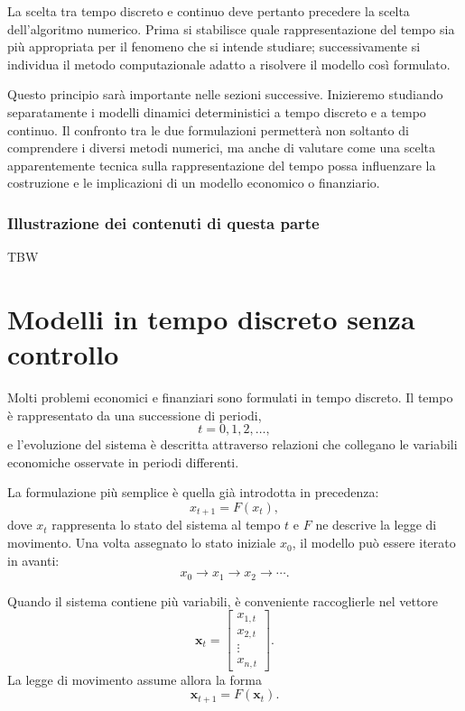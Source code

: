 \documentclass{book}
\begin{document}
La scelta tra tempo discreto e continuo deve pertanto precedere la scelta dell'algoritmo numerico. Prima si stabilisce quale rappresentazione del tempo sia più appropriata per il fenomeno che si intende studiare; successivamente si individua il metodo computazionale adatto a risolvere il modello così formulato.

Questo principio sarà importante nelle sezioni successive. Inizieremo studiando separatamente i modelli dinamici deterministici a tempo discreto e a tempo continuo. Il confronto tra le due formulazioni permetterà non soltanto di comprendere i diversi metodi numerici, ma anche di valutare come una scelta apparentemente tecnica sulla rappresentazione del tempo possa influenzare la costruzione e le implicazioni di un modello economico o finanziario.


\section{Illustrazione dei contenuti di questa parte}

TBW


\part{Modelli in tempo discreto senza controllo}


Molti problemi economici e finanziari sono formulati in tempo discreto.
Il tempo è rappresentato da una successione di periodi,
\[
t=0,1,2,\ldots,
\]
e l'evoluzione del sistema è descritta attraverso relazioni che collegano
le variabili economiche osservate in periodi differenti.

La formulazione più semplice è quella già introdotta in precedenza:
\[
x_{t+1}=F(x_t),
\]
dove $x_t$ rappresenta lo stato del sistema al tempo $t$ e $F$ ne
descrive la legge di movimento. Una volta assegnato lo stato iniziale
$x_0$, il modello può essere iterato in avanti:
\[
x_0 \longrightarrow x_1 \longrightarrow x_2
\longrightarrow \cdots.
\]

Quando il sistema contiene più variabili, è conveniente raccoglierle
nel vettore
\[
\mathbf{x}_t=
\begin{bmatrix}
x_{1,t}\\
x_{2,t}\\
\vdots\\
x_{n,t}
\end{bmatrix}.
\]
La legge di movimento assume allora la forma
\[
\mathbf{x}_{t+1}=F(\mathbf{x}_t).
\]
\end{document}
